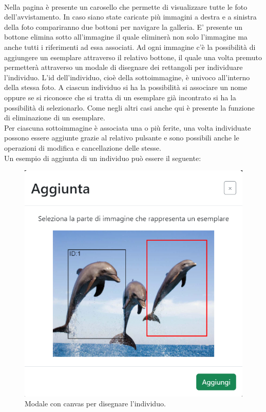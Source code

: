 \documentclass[a4paper,final,12pt]{report}
\begin{document}
\\Nella pagina è presente un carosello che permette di visualizzare tutte le foto dell'avvistamento. In caso siano state caricate più immagini a destra e a sinistra della foto compariranno due bottoni per navigare la galleria. E' presente un bottone elimina sotto all'immagine il quale eliminerà non solo l'immagine ma anche tutti i riferimenti ad essa associati.
Ad ogni immagine c'è la possibilità di aggiungere un esemplare attraverso il relativo bottone, il quale una volta premuto permetterà attraverso un modale di disegnare dei rettangoli per individuare l'individuo. L'id dell'individuo, cioè della sottoimmagine, è univoco all'interno della stessa foto. A ciascun individuo si ha la possibilità si associare un nome oppure se si riconosce che si tratta di un esemplare già incontrato si ha la possibilità di selezionarlo. Come negli altri casi anche qui è presente la funzione di eliminazione di un esemplare.\\
Per ciascuna sottoimmagine è associata una o più ferite, una volta individuate possono essere aggiunte grazie al relativo pulsante e sono possibili anche le operazioni di modifica e cancellazione delle stesse.\\
Un esempio di aggiunta di un individuo può essere il seguente:  
\begin{figure}[hbtp]
\centering
\includegraphics[scale=0.42]{img_concettuale/addEsempl.png}
\caption{Modale con canvas per disegnare l'individuo.}
\end{figure}
\end{document}

